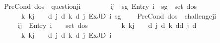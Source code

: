 \begin{isabellebody}
\ \ {\isacharbar}{\kern0pt}\ {\isachardoublequoteopen}PreCond\ dos\ {\isasymGamma}\ question{\isacharbrackleft}{\kern0pt}j{\isacharcomma}{\kern0pt}i{\isacharcomma}{\kern0pt}{\isasymphi}{\isacharbrackright}{\kern0pt}\ {\isacharequal}{\kern0pt}\isanewline
\ \ \ \ \ \ \ {\isacharparenleft}{\kern0pt}i{\isasymnoteq}j\ {\isasymand}\ {\isacharparenleft}{\kern0pt}{\isasymexists}sg{\isachardot}{\kern0pt}\ {\isacharparenleft}{\kern0pt}Entry\ i\ {\isasymphi}\ sg{\isacharparenright}{\kern0pt}\ {\isasymin}\ set\ dos\ {\isasymand}\isanewline
\ \ \ \ \ \ \ \ {\isacharparenleft}{\kern0pt}{\isasymforall}k{\isachardot}{\kern0pt}\ k{\isasymnoteq}j\ {\isasymlongrightarrow}\ {\isasymGamma}\ {\isasymTurnstile}\ {\isasymD}\isactrlsup d\ j\ {\isacharparenleft}{\kern0pt}{\isasymB}\isactrlsup d\ k\ {\isacharparenleft}{\kern0pt}{\isasymD}\isactrlsup d\ j\ {\isacharparenleft}{\kern0pt}ExJD\ i\ sg\ {\isasymphi}{\isacharparenright}{\kern0pt}{\isacharparenright}{\kern0pt}{\isacharparenright}{\kern0pt}{\isacharparenright}{\kern0pt}{\isacharparenright}{\kern0pt}{\isacharparenright}{\kern0pt}{\isachardoublequoteclose}\isanewline
\ \ {\isacharbar}{\kern0pt}\ {\isachardoublequoteopen}PreCond\ dos\ {\isasymGamma}\ challenge{\isacharbrackleft}{\kern0pt}j{\isacharcomma}{\kern0pt}i{\isacharcomma}{\kern0pt}{\isasymphi}{\isacharbrackright}{\kern0pt}\ {\isacharequal}{\kern0pt}\isanewline
\ \ \ \ \ \ \ {\isacharparenleft}{\kern0pt}i{\isasymnoteq}j\ {\isasymand}\ {\isacharparenleft}{\kern0pt}Entry\ i\ {\isasymphi}\ {\isasymoplus}{\isacharparenright}{\kern0pt}\ {\isasymin}\ set\ dos\ {\isasymand}\isanewline
\ \ \ \ \ \ \ \ {\isacharparenleft}{\kern0pt}{\isasymforall}k{\isachardot}{\kern0pt}\ k{\isasymnoteq}j\ {\isasymlongrightarrow}\ {\isasymGamma}\ {\isasymTurnstile}\ {\isasymD}\isactrlsup d\ j\ {\isacharparenleft}{\kern0pt}{\isasymB}\isactrlsup d\ k\ {\isacharparenleft}{\kern0pt}{\isasymnot}\isactrlsup d{\isacharparenleft}{\kern0pt}{\isasymB}\isactrlsup d\ j\ {\isacharbraceleft}{\kern0pt}{\isasymphi}{\isacharbraceright}{\kern0pt}\isactrlsup d{\isacharparenright}{\kern0pt}{\isacharparenright}{\kern0pt}{\isacharparenright}{\kern0pt}{\isacharparenright}{\kern0pt}\ {\isasymand}\isanewline
\ \ \ \ \ \ \ \ {\isacharparenleft}{\kern0pt}{\isasymforall}k{\isachardot}{\kern0pt}\ k{\isasymnoteq}j\ {\isasymlongrightarrow}\ {\isasymGamma}\ {\isasymTurnstile}\ {\isasymD}\isactrlsup d\ j\ {\isacharparenleft}{\kern0pt}{\isasymB}\isactrlsup d\ k\ {\isacharparenleft}{\kern0pt}{\isasymD}\isactrlsup d\ j\ {\isacharparenleft}{\kern0pt}ExJD\ i\ {\isasymoplus}\ {\isasymphi}{\isacharparenright}{\kern0pt}{\isacharparenright}{\kern0pt}{\isacharparenright}{\kern0pt}{\isacharparenright}{\kern0pt}{\isacharparenright}{\kern0pt}{\isachardoublequoteclose}\isanewline

\end{isabellebody}

